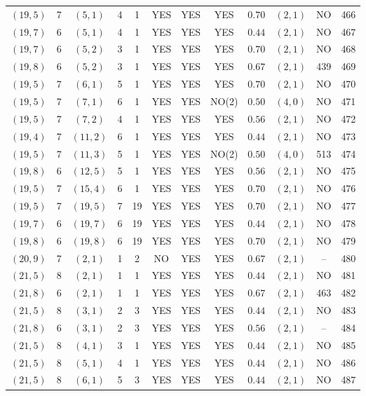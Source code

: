 \begin{longtable}{|c|c|c|c|c|c|c|c|c|c|c|c|}
$(19,5)$ & 7 & $(5,1)$ & 4 & 1 & YES & YES & YES & $0.70$ & $(2,1)$ & NO & 466\\
$(19,7)$ & 6 & $(5,1)$ & 4 & 1 & YES & YES & YES & $0.44$ & $(2,1)$ & NO & 467\\
$(19,7)$ & 6 & $(5,2)$ & 3 & 1 & YES & YES & YES & $0.70$ & $(2,1)$ & NO & 468\\
$(19,8)$ & 6 & $(5,2)$ & 3 & 1 & YES & YES & YES & $0.67$ & $(2,1)$ & 439 & 469\\
$(19,5)$ & 7 & $(6,1)$ & 5 & 1 & YES & YES & YES & $0.70$ & $(2,1)$ & NO & 470\\
$(19,5)$ & 7 & $(7,1)$ & 6 & 1 & YES & YES & NO(2) & $0.50$ & $(4,0)$ & NO & 471\\
$(19,5)$ & 7 & $(7,2)$ & 4 & 1 & YES & YES & YES & $0.56$ & $(2,1)$ & NO & 472\\
$(19,4)$ & 7 & $(11,2)$ & 6 & 1 & YES & YES & YES & $0.44$ & $(2,1)$ & NO & 473\\
$(19,5)$ & 7 & $(11,3)$ & 5 & 1 & YES & YES & NO(2) & $0.50$ & $(4,0)$ & 513 & 474\\
$(19,8)$ & 6 & $(12,5)$ & 5 & 1 & YES & YES & YES & $0.56$ & $(2,1)$ & NO & 475\\
$(19,5)$ & 7 & $(15,4)$ & 6 & 1 & YES & YES & YES & $0.70$ & $(2,1)$ & NO & 476\\
$(19,5)$ & 7 & $(19,5)$ & 7 & 19 & YES & YES & YES & $0.70$ & $(2,1)$ & NO & 477\\
$(19,7)$ & 6 & $(19,7)$ & 6 & 19 & YES & YES & YES & $0.44$ & $(2,1)$ & NO & 478\\
$(19,8)$ & 6 & $(19,8)$ & 6 & 19 & YES & YES & YES & $0.70$ & $(2,1)$ & NO & 479\\
$(20,9)$ & 7 & $(2,1)$ & 1 & 2 & NO & YES & YES & $0.67$ & $(2,1)$ & -- & 480\\
$(21,5)$ & 8 & $(2,1)$ & 1 & 1 & YES & YES & YES & $0.44$ & $(2,1)$ & NO & 481\\
$(21,8)$ & 6 & $(2,1)$ & 1 & 1 & YES & YES & YES & $0.67$ & $(2,1)$ & 463 & 482\\
$(21,5)$ & 8 & $(3,1)$ & 2 & 3 & YES & YES & YES & $0.44$ & $(2,1)$ & NO & 483\\
$(21,8)$ & 6 & $(3,1)$ & 2 & 3 & YES & YES & YES & $0.56$ & $(2,1)$ & -- & 484\\
$(21,5)$ & 8 & $(4,1)$ & 3 & 1 & YES & YES & YES & $0.44$ & $(2,1)$ & NO & 485\\
$(21,5)$ & 8 & $(5,1)$ & 4 & 1 & YES & YES & YES & $0.44$ & $(2,1)$ & NO & 486\\
$(21,5)$ & 8 & $(6,1)$ & 5 & 3 & YES & YES & YES & $0.44$ & $(2,1)$ & NO & 487\\

\end{longtable}
